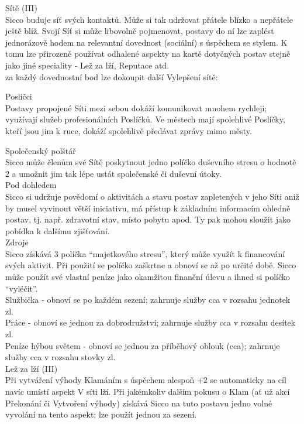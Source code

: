 \documentclass[../main.tex]{subfiles}
\begin{document}
Sítě (III)\\
Sicco buduje síť svých kontaktů. Může si tak udržovat přátele blízko a nepřátele ještě blíž. Svojí Síť si může libovolně pojmenovat, postavy do ní lze zaplést jednorázově hodem na relevantní dovednost (sociální) s úspěchem se stylem. K tomu lze přirozeně používat odhalené aspekty na kartě dotyčných postav stejně jako jiné speciality - Lež za lží, Reputace atd.\\
za každý dovednostní bod lze dokoupit další Vylepšení sítě:

Poslíčci\\
Postavy propojené Síti mezi sebou dokáží komunikovat mnohem rychleji; využívají služeb profesionálních Poslíčků. Ve městech mají spolehlivé Poslíčky, kteří jsou jim k ruce, dokáží spolehlivě předávat zprávy mimo městy.

Společenský polštář\\
Sicco může členům své Sítě poskytnout jedno políčko duševního stresu o hodnotě 2 a umožnit jim tak lépe ustát společenské či duševní útoky.\\

Pod dohledem\\
Sicco si udržuje povědomí o aktivitách a stavu postav zapletených v jeho Síti
aniž by musel vyvinout větší iniciativu, má přístup k základním informacím ohledně postav, tj. např. zdravotní stav, místo pobytu apod. Ty pak mohou sloužit jako pobídka k dalšímu zjišťování.\\

Zdroje\\
Sicco získává 3 políčka “majetkového stresu”, který může využít k financování svých aktivit. Při použití se políčko zaškrtne a obnoví se až po určité době. Sicco může použít své vlastní peníze jako okamžitou finanční úlevu a ihned si políčko “vyléčit”.\\

Službička - obnoví se po každém sezení; zahrnuje služby cca v rozsahu jednotek zl.\\
Práce - obnoví se jednou za dobrodružství; zahrnuje služby cca v rozsahu desítek zl.\\
Peníze hýbou světem - obnoví se jednou za příběhový oblouk (cca); zahrnuje služby cca v rozsahu stovky zl.\\


Lež za lží (III)\\
Při vytváření výhody Klamáním s úspěchem alespoň +2 se automaticky na cíl navíc umístí aspekt V síti lží. Při jakémkoliv dalším pokusu o Klam (ať už akcí Překonání či Vytvoření výhody) získává Sicco na tuto postavu jedno volné vyvolání na tento aspekt; lze použít jednou za sezení. \\
\end{document}
